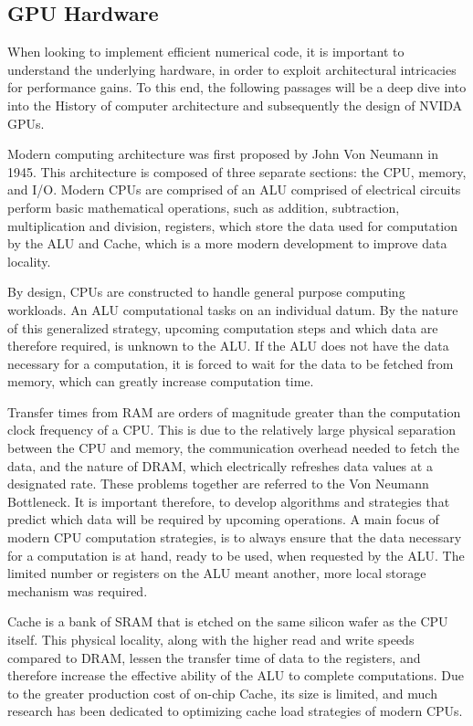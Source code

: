 \subsection{GPU Hardware}
When looking to implement efficient numerical code, it is important to understand
 the underlying hardware, in order to exploit architectural intricacies for performance gains.
 To this end, the following passages will be a deep dive into into the History of
 computer architecture and subsequently the design of NVIDA \Glspl{GPU}.
\par
Modern computing architecture was first proposed by John Von Neumann in 1945\cite{vonNeumann}.
This architecture is composed of three separate sections: the \Gls{CPU}, memory, and \Gls{I/O}.
Modern \Glspl{CPU} are comprised of an \Gls{ALU} comprised of electrical circuits
perform basic mathematical operations, such as addition, subtraction, multiplication and division,
registers, which store the data used for computation by the ALU and Cache, which is a more modern development to improve data locality.
\par
By design, \Glspl{CPU} are constructed
to handle general purpose computing workloads.
An \Gls{ALU} computational
tasks on an individual datum. By the nature of this
generalized strategy, upcoming computation steps and which data are therefore required,
is unknown to the \Gls{ALU}. If the ALU does not have the data necessary for a computation,
it is forced to wait for the data to be fetched from memory, which can greatly increase computation time.
\par
Transfer times from \Gls{RAM}
are orders of magnitude greater than the computation clock frequency of
a CPU.  This is due to the relatively large physical separation between the CPU and memory,
 the communication overhead needed to fetch the data, and
the nature of \Gls{DRAM}, which electrically refreshes data values at a designated rate.
These problems together are referred to the Von Neumann Bottleneck\cite{Backus}.
It is important therefore, to develop algorithms and strategies that  predict which data will be required by upcoming operations.
A main focus of modern CPU computation strategies, is to always ensure that the data
necessary for a computation is at hand, ready to be used, when requested by the \Gls{ALU}.
The limited number or registers on the ALU meant another, more local storage mechanism
was required.
\par
Cache is a bank of \Gls{SRAM}
that is etched on the same silicon wafer as the CPU itself.  This physical locality,
along with the higher read and write speeds compared to \Gls{DRAM}, lessen the transfer
time of data to the registers, and therefore increase the effective ability of the
 \Gls{ALU} to complete computations.
Due to the greater production cost of on-chip Cache, its size is limited, and
much research has been dedicated to optimizing cache load strategies of modern CPUs.
\par

